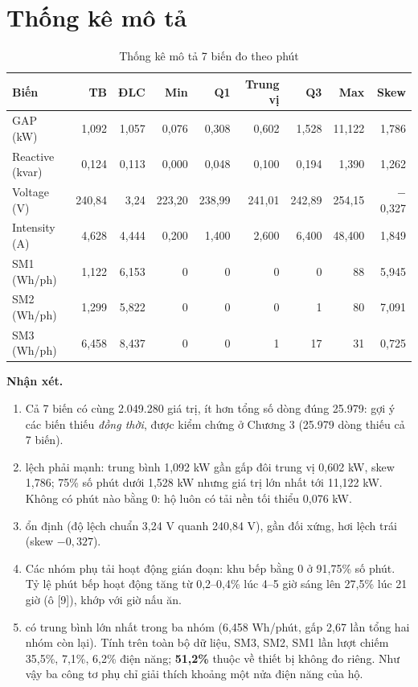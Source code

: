\documentclass[../main.tex]{subfiles}
\begin{document}
\section{Thống kê mô tả}
\begin{table}[H]
\centering
\caption{Thống kê mô tả 7 biến đo theo phút}
\label{tab:thong-ke}
\small
\begin{tabular}{|l|r|r|r|r|r|r|r|r|}
\hline
\textbf{Biến} & \textbf{TB} & \textbf{ĐLC} & \textbf{Min} & \textbf{Q1} & \textbf{Trung vị} & \textbf{Q3} & \textbf{Max} & \textbf{Skew} \\
\hline
GAP (kW) & 1,092 & 1,057 & 0,076 & 0,308 & 0,602 & 1,528 & 11,122 & 1,786 \\
Reactive (kvar) & 0,124 & 0,113 & 0,000 & 0,048 & 0,100 & 0,194 & 1,390 & 1,262 \\
Voltage (V) & 240,84 & 3,24 & 223,20 & 238,99 & 241,01 & 242,89 & 254,15 & $-$0,327 \\
Intensity (A) & 4,628 & 4,444 & 0,200 & 1,400 & 2,600 & 6,400 & 48,400 & 1,849 \\
SM1 (Wh/ph) & 1,122 & 6,153 & 0 & 0 & 0 & 0 & 88 & 5,945 \\
SM2 (Wh/ph) & 1,299 & 5,822 & 0 & 0 & 0 & 1 & 80 & 7,091 \\
SM3 (Wh/ph) & 6,458 & 8,437 & 0 & 0 & 1 & 17 & 31 & 0,725 \\
\hline
\end{tabular}
\end{table}

\textbf{Nhận xét.}
\begin{enumerate}[1.]
    \item Cả 7 biến có cùng 2.049.280 giá trị, ít hơn tổng số dòng đúng 25.979: gợi ý các biến thiếu \textit{đồng thời}, được kiểm chứng ở Chương 3 (25.979 dòng thiếu cả 7 biến).
    \item {} lệch phải mạnh: trung bình 1,092 kW gần gấp đôi trung vị 0,602 kW, skew 1,786; 75\% số phút dưới 1,528 kW nhưng giá trị lớn nhất tới 11,122 kW. Không có phút nào bằng 0: hộ luôn có tải nền tối thiểu 0,076 kW.
    \item {} ổn định (độ lệch chuẩn 3,24 V quanh 240,84 V), gần đối xứng, hơi lệch trái (skew $-0{,}327$).
    \item Các nhóm phụ tải hoạt động gián đoạn: khu bếp bằng 0 ở 91,75\% số phút. Tỷ lệ phút bếp hoạt động tăng từ 0,2--0,4\% lúc 4--5 giờ sáng lên 27,5\% lúc 21 giờ (ô [9]), khớp với giờ nấu ăn.
    \item {} có trung bình lớn nhất trong ba nhóm (6,458 Wh/phút, gấp 2,67 lần tổng hai nhóm còn lại). Tính trên toàn bộ dữ liệu, SM3, SM2, SM1 lần lượt chiếm 35,5\%, 7,1\%, 6,2\% điện năng; \textbf{51,2\%} thuộc về thiết bị không đo riêng. Như vậy ba công tơ phụ chỉ giải thích khoảng một nửa điện năng của hộ.
\end{enumerate}
\end{document}
